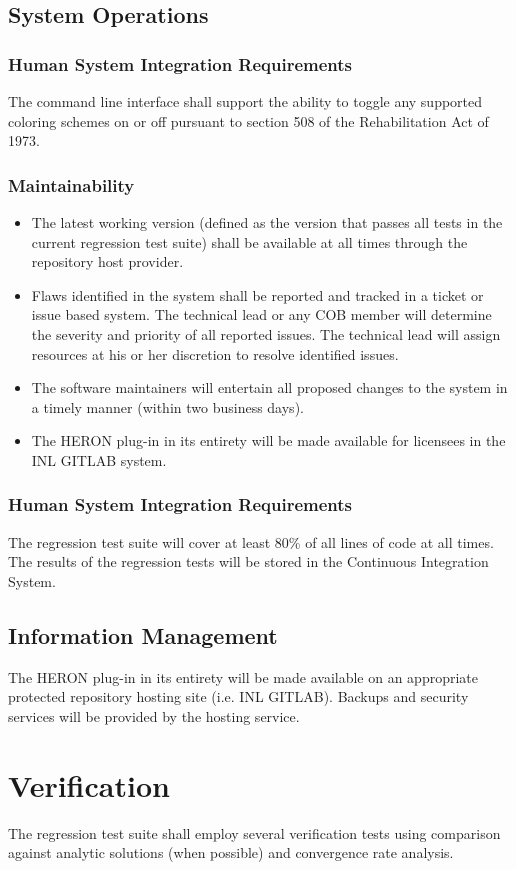 \subsection{System Operations}
\subsubsection{Human System Integration Requirements}
The command line interface shall support the ability to toggle any supported coloring schemes on or off pursuant to section 
508 of the Rehabilitation Act of 1973.
\subsubsection{Maintainability}
\begin{itemize}
  \item The latest working version (defined as the version that passes all tests in the current regression test suite) shall be 
            available at all times through the repository host provider.
  \item  Flaws identified in the system shall be reported and tracked in a ticket or issue based system. The technical lead or 
            any COB member will 
            determine the severity and priority of all reported issues. The technical lead will assign resources at his or her 
            discretion to resolve identified issues.
  \item  The software maintainers will entertain all proposed changes to the system in a timely manner 
           (within two business days).        
%
%
  \item  The HERON plug-in in its entirety will be made available for licensees in the INL GITLAB system.    
\end{itemize}
\subsubsection{Human System Integration Requirements}
The regression test suite will cover at least 80\% of all lines of code at all times. 
The results of the regression tests will be stored in the Continuous Integration System.

\subsection{Information Management}
%
%
The HERON plug-in in its entirety will be made available on an appropriate protected repository hosting site (i.e. INL GITLAB).
Backups and security services will be provided by the hosting service.

\section{Verification}
The regression test suite shall employ several verification tests using comparison against analytic 
solutions (when possible) and convergence rate analysis. 